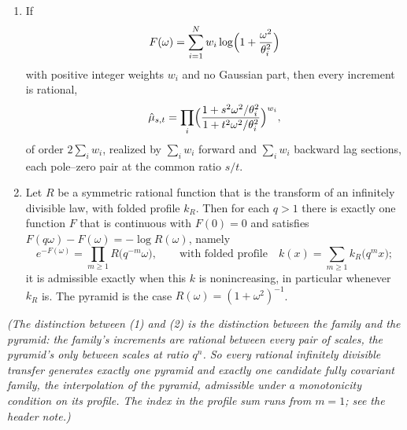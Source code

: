 \begin{proposition}
\label{prop:rational-increments}
\begin{enumerate}
\item If
\[
  F(\omega) = \sum_{i=1}^N w_i\log\Bigl(1 + \frac{\omega^2}{\theta_i^2}\Bigr)
\]
with positive integer weights $w_i$ and no Gaussian part, then every increment is rational,
\[
  \hat\mu_{s,t} = \prod_i\Bigl(\frac{1 + s^2\omega^2/\theta_i^2}{1 + t^2\omega^2/\theta_i^2}\Bigr)^{w_i},
\]
of order $2\sum_i w_i$, realized by $\sum_i w_i$ forward and $\sum_i w_i$ backward lag sections,
each pole--zero pair at the common ratio $s/t$.
\item Let $R$ be a symmetric rational function that is the transform of an infinitely divisible
law, with folded \Levy{} profile $k_R$. Then for each $q > 1$ there is exactly one function $F$
that is continuous with $F(0) = 0$ and satisfies $F(q\omega) - F(\omega) = -\log R(\omega)$,
namely
\[
  e^{-F(\omega)} = \prod_{m \ge 1} R\bigl(q^{-m}\omega\bigr),
  \qquad \text{with folded profile} \quad
  k(x) = \sum_{m \ge 1} k_R\bigl(q^m x\bigr);
\]
it is admissible exactly when this $k$ is nonincreasing, in particular whenever $k_R$ is. The
\Matern{} pyramid is the case $R(\omega) = (1+\omega^2)^{-1}$.
\end{enumerate}
\statusT\quad\emph{(The distinction between (1) and (2) is the distinction between the \Matern{}
\emph{family} and the \Matern{} \emph{pyramid}: the family's increments are rational between every
pair of scales, the pyramid's only between scales at ratio $q^n$. So every rational infinitely
divisible transfer generates exactly one pyramid and exactly one candidate fully covariant
family, the interpolation of the pyramid, admissible under a monotonicity condition on its
profile. The index in the profile sum runs from $m = 1$; see the header note.)}
\end{proposition}

